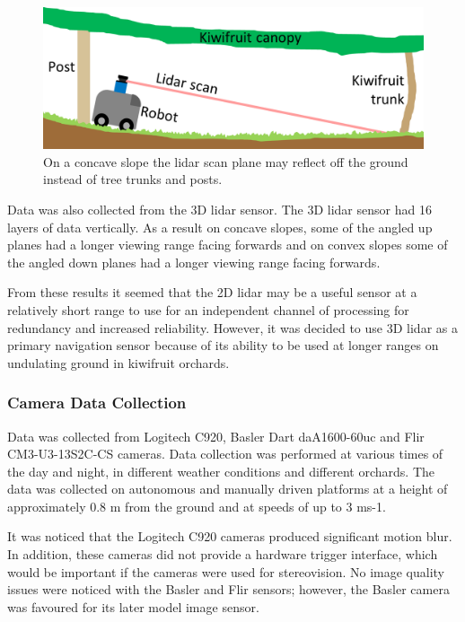 \documentclass[preprint,authoryear,12pt]{elsarticle}
\begin{document}
    \begin{figure}[htb]
        \centering
        \includegraphics[width=\linewidth]{imgs/photos/concaveSlope.png}
        \caption{
            On a concave slope the lidar scan plane may reflect off the ground instead of tree trunks and posts.
        }
        \label{fig:concaveSlope}
    \end{figure}

    Data was also collected from the 3D lidar sensor. The 3D lidar sensor had 16 layers of data vertically. As a result on concave slopes, some of the angled up planes had a longer viewing range facing forwards and on convex slopes some of the angled down planes had a longer viewing range facing forwards.

    From these results it seemed that the 2D lidar may be a useful sensor at a relatively short range to use for an independent channel of processing for redundancy and increased reliability. However, it was decided to use 3D lidar as a primary navigation sensor because of its ability to be used at longer ranges on undulating ground in kiwifruit orchards.

\subsubsection{Camera Data Collection}
    Data was collected from Logitech C920, Basler Dart daA1600-60uc and Flir CM3-U3-13S2C-CS cameras. Data collection was performed at various times of the day and night, in different weather conditions and different orchards. The data was collected on autonomous and manually driven platforms at a height of approximately 0.8 m from the ground and at speeds of up to 3 ms-1. 

    It was noticed that the Logitech C920 cameras produced significant motion blur. In addition, these cameras did not provide a hardware trigger interface, which would be important if the cameras were used for stereovision. No image quality issues were noticed with the Basler and Flir sensors; however, the Basler camera was favoured for its later model image sensor.
\end{document}
